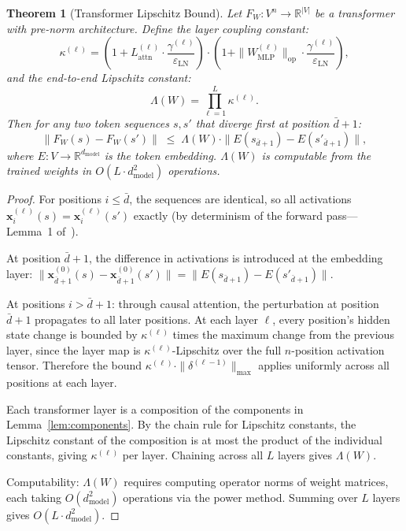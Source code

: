 \documentclass[11pt]{article}
\newtheorem{theorem}{Theorem}
\begin{document}
\begin{theorem}[Transformer Lipschitz Bound]
\label{thm:lipschitz}
Let $F_W: V^n \to \mathbb{R}^{|V|}$ be a transformer with pre-norm architecture.
Define the \emph{layer coupling constant}:
\[
  \kappa^{(\ell)} = \left(1 + L_{\mathrm{attn}}^{(\ell)} \cdot \frac{\gamma^{(\ell)}}{\varepsilon_{\mathrm{LN}}}\right)
  \cdot \left(1 + \|W_{\mathrm{MLP}}^{(\ell)}\|_{\mathrm{op}} \cdot \frac{\gamma^{(\ell)}}{\varepsilon_{\mathrm{LN}}}\right),
\]
and the \emph{end-to-end Lipschitz constant}:
\[
  \Lambda(W) = \prod_{\ell=1}^{L} \kappa^{(\ell)}.
\]
Then for any two token sequences $s, s'$ that diverge first at position $\bar{d}+1$:
\[
  \|F_W(s) - F_W(s')\|
  \;\leq\;
  \Lambda(W) \cdot \|E(s_{\bar{d}+1}) - E(s'_{\bar{d}+1})\|,
\]
where $E: V \to \mathbb{R}^{d_{\mathrm{model}}}$ is the token embedding.
$\Lambda(W)$ is computable from the trained weights in $O(L \cdot d_{\mathrm{model}}^2)$ operations.
\end{theorem}

\begin{proof}
For positions $i \leq \bar{d}$, the sequences are identical, so all activations
$\mathbf{x}^{(\ell)}_i(s) = \mathbf{x}^{(\ell)}_i(s')$ exactly (by
determinism of the forward pass---Lemma~1 of~\cite{kv2026}).

At position $\bar{d}+1$, the difference in activations is introduced at the embedding
layer: $\|\mathbf{x}^{(0)}_{\bar{d}+1}(s) - \mathbf{x}^{(0)}_{\bar{d}+1}(s')\|
= \|E(s_{\bar{d}+1}) - E(s'_{\bar{d}+1})\|$.

At positions $i > \bar{d}+1$: through causal attention, the perturbation at position $\bar{d}+1$ propagates to all later positions.  At each layer $\ell$, every position's hidden state change is bounded by $\kappa^{(\ell)}$ times the maximum change from the previous layer, since the layer map is $\kappa^{(\ell)}$-Lipschitz over the full $n$-position activation tensor.  Therefore the bound $\kappa^{(\ell)}\cdot\|\delta^{(\ell-1)}\|_{\max}$ applies uniformly across all positions at each layer.

Each transformer layer is a composition of the components in
Lemma~\ref{lem:components}.  By the chain rule for Lipschitz constants,
the Lipschitz constant of the composition is at most the product of the
individual constants, giving $\kappa^{(\ell)}$ per layer.  Chaining across
all $L$ layers gives $\Lambda(W)$.

Computability: $\Lambda(W)$ requires computing operator norms of weight matrices,
each taking $O(d_{\mathrm{model}}^2)$ operations via the power method.  Summing over $L$ layers
gives $O(L \cdot d_{\mathrm{model}}^2)$.
\end{proof}
\end{document}

